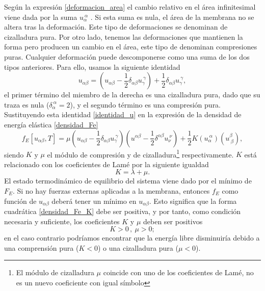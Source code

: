 Según la expresión \eqref{deformacion_area} el cambio relativo en el área infinitesimal
viene dada por la suma $u_{\alpha}^{\ \alpha}$ . Si esta suma es nula, el área
de la membrana no se altera tras la deformación. Este tipo de deformaciones se
denominan de cizalladura pura. Por otro lado, tenemos las deformaciones que
mantienen la forma pero producen un cambio en el área, este tipo de denominan
compresiones puras. Cualquier deformación puede descomponerse como una suma de
los dos tipos anteriores. Para ello, usamos la siguiente identidad
\begin{equation}\label{identidad_u}
u_{\alpha\beta}=(u_{\alpha\beta}-\frac{1}{2}\delta_{\alpha\beta}u_{\gamma}^{\
  \gamma})+\frac{1}{2}\delta_{\alpha\beta}u_{\gamma}^{\ \gamma},
\end{equation}
el primer término del miembro de la derecha es una cizalladura pura, dado que
su traza es nula ($\delta_{\alpha}^{\ \alpha}=2$), y el segundo término es una
compresión pura. Sustituyendo esta identidad \eqref{identidad_u} en la expresión de la densidad de
energía elástica \eqref{densidad_Fe}
\begin{equation}\label{densidad_Fe_K}
f_E[u_{\alpha\beta},T]=
\mu \left(u_{\alpha\beta}-\frac{1}{2}\delta_{\alpha\beta}u_{\gamma}^{\ \gamma}\right)
    \left(u^{\alpha\beta}-\frac{1}{2}\delta^{\alpha\beta}u_{\nu}^{\ \nu}\right)+
\frac{1}{2}K(u_{\alpha}^{\ \alpha})(u_{\ \beta}^{\beta}),
\end{equation}
siendo $K$ y $\mu$ el módulo de compresión y de
cizalladura\footnote{El módulo de cizalladura $\mu$ coincide con uno de los
  coeficientes de Lamé, no es un nuevo coeficiente con igual símbolo} respectivamente. $K$
está relacionado con los coeficientes de Lamé por la siguiente igualdad
\begin{equation*}
K=\lambda+\mu.
\end{equation*}
El estado termodinámico de equilibrio del sistema viene dado por el mínimo de
$F_E$. Si no hay fuerzas externas aplicadas a la membrana, entonces $f_E$ como
función de $u_{\alpha\beta}$ deberá tener un mínimo en $u_{\alpha\beta}$. Esto
significa que la forma cuadrática \eqref{densidad_Fe_K} debe ser positiva, y por
tanto, como condición necesaria y suficiente, los coeficientes $K$ y $\mu$ deben ser positivos
\begin{equation*}
K>0\, ,\ \mu>0;
\end{equation*}
en el caso contrario podríamos encontrar que la energía libre disminuiría debido a una
comprensión pura ($K<0$) o una cizalladura pura ($\mu<0$).

